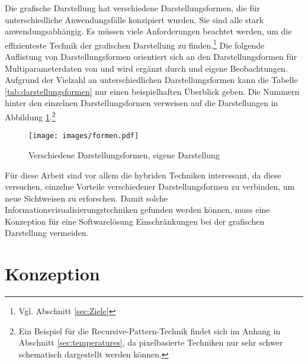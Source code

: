 \documentclass[a4paper, 
               12pt,
               DIV=calc,
               version=first,
               pdftex,
               headsepline,
               footsepline,
               bibliography=totocnumbered,
               listof=numbered]{scrreprt}
\begin{document}
Die grafische Darstellung hat verschiedene Darstellungsformen, die für unterschiedliche
Anwendungsfälle konzipiert wurden. Sie sind alle stark anwendungsabhängig. Es müssen viele
Anforderungen beachtet werden, um die effizienteste Technik der grafischen Darstellung zu
finden.\footnote{Vgl. Abschnitt \ref{sec:Ziele}}
Die folgende Auflistung von Darstellungsformen orientiert sich an den Darstellungsformen für
Multiparameterdaten von \cite{Schumann} und
wird ergänzt durch \cite{Preim} und eigene Beobachtungen. Aufgrund der Vielzahl an unterschiedlichen
Darstellungsformen kann die Tabelle \ref{tab:darstellungsformen} nur einen beispielhaften Überblick geben. Die
Nummern hinter den einzelnen Darstellungsformen verweisen auf die Darstellungen in 
Abbildung \ref{fig:formen}.\footnote{Ein Beispiel für die Recursive-Pattern-Technik
findet sich im Anhang in Abschnitt \ref{sec:temperatures}, da pixelbasierte
Techniken nur sehr schwer schematisch dargestellt werden können.}

\begin{figure}
\centering
\texttt{[image: images/formen.pdf]}
\caption{Verschiedene Darstellungsformen, eigene Darstellung}
\label{fig:formen}
\end{figure}

Für diese Arbeit sind vor allem die hybriden Techniken interessant, da diese versuchen,
einzelne Vorteile verschiedener Darstellungsformen zu verbinden, um neue Sichtweisen zu erforschen.
Damit solche Informationsvisualisierungstechniken gefunden werden können, muss eine Konzeption für eine
Softwarelösung Einschränkungen bei der grafischen Darstellung vermeiden.

\chapter{Konzeption}
\label{cha:Software}
\end{document}
